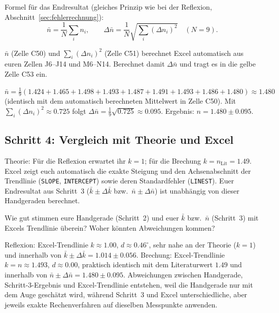 \documentclass[11pt,a4paper]{article}
\newcommand{\zeichenraum}[1][4.5cm]{%
  \par\vspace{4pt}\noindent
  \fbox{\begin{minipage}[t][#1][t]{\dimexpr\linewidth-2\fboxsep-2\fboxrule}\ \end{minipage}}
  \vspace{4pt}
}
\begin{document}
Formel für das Endresultat (gleiches Prinzip wie bei der Reflexion, Abschnitt~\ref{sec:fehlerrechnung}):
\[
  \bar n = \frac{1}{N}\sum_i n_i, \qquad \Delta \bar n = \frac{1}{N}\sqrt{\sum_i (\Delta n_i)^2} \quad (N=9).
\]
\begin{aufgabebox}
$\bar n$ (Zelle C50) und $\sum_i(\Delta n_i)^2$ (Zelle C51) berechnet Excel automatisch aus euren Zellen J6--J14 und M6--N14. Berechnet damit $\Delta\bar n$ und tragt es in die gelbe Zelle C53 ein.
\end{aufgabebox}
\zeichenraum[3cm]
\begin{solution}
\begin{loesungbox}
$\bar n = \frac{1}{9}(1.424+1.465+1.498+1.493+1.487+1.491+1.493+1.486+1.480) \approx 1.480$ (identisch mit dem automatisch berechneten Mittelwert in Zelle C50). Mit $\sum_i(\Delta n_i)^2\approx0.725$ folgt $\Delta\bar n = \frac{1}{9}\sqrt{0.725}\approx0.095$. Ergebnis: $n=1.480\pm0.095$.
\end{loesungbox}
\end{solution}

\subsection{Schritt 4: Vergleich mit Theorie und Excel}
Theorie: Für die Reflexion erwartet ihr $k=1$; für die Brechung $k=n_{\text{Lit}}=1.49$. Excel zeigt euch automatisch die exakte Steigung und den Achsenabschnitt der Trendlinie (\texttt{SLOPE}, \texttt{INTERCEPT}) sowie deren Standardfehler (\texttt{LINEST}). Euer Endresultat aus Schritt~3 ($\bar k\pm\Delta\bar k$ bzw.\ $\bar n\pm\Delta\bar n$) ist unabhängig von dieser Handgeraden berechnet.

\begin{aufgabebox}
Wie gut stimmen eure Handgerade (Schritt~2) und euer $\bar k$ bzw.\ $\bar n$ (Schritt~3) mit Excels Trendlinie überein? Woher könnten Abweichungen kommen?
\end{aufgabebox}
\zeichenraum[4.8cm]
\begin{solution}
\begin{loesungbox}
Reflexion: Excel-Trendlinie $k\approx1.00$, $d\approx0.46^\circ$, sehr nahe an der Theorie ($k=1$) und innerhalb von $\bar k\pm\Delta\bar k=1.014\pm0.056$. Brechung: Excel-Trendlinie $k=n\approx1.493$, $d\approx0.00$, praktisch identisch mit dem Literaturwert $1.49$ und innerhalb von $\bar n\pm\Delta\bar n=1.480\pm0.095$. Abweichungen zwischen Handgerade, Schritt-3-Ergebnis und Excel-Trendlinie entstehen, weil die Handgerade nur mit dem Auge geschätzt wird, während Schritt~3 und Excel unterschiedliche, aber jeweils exakte Rechenverfahren auf dieselben Messpunkte anwenden.
\end{loesungbox}
\end{solution}
\end{document}
